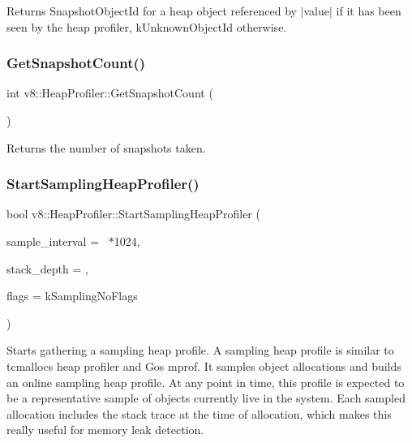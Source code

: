 Returns Snapshot\+Object\+Id for a heap object referenced by $\vert$value$\vert$ if it has been seen by the heap profiler, k\+Unknown\+Object\+Id otherwise. \mbox{\label{classv8_1_1HeapProfiler_a24830775a0ab938eb0a29ed8f3dfd265}} 
\subsubsection{\texorpdfstring{Get\+Snapshot\+Count()}{GetSnapshotCount()}}
{\footnotesize\ttfamily int v8\+::\+Heap\+Profiler\+::\+Get\+Snapshot\+Count (\begin{DoxyParamCaption}{ }\end{DoxyParamCaption})}

Returns the number of snapshots taken. \mbox{\label{classv8_1_1HeapProfiler_a6b9450bbf1f4e1a4909df92d4df4a174}} 
\subsubsection{\texorpdfstring{Start\+Sampling\+Heap\+Profiler()}{StartSamplingHeapProfiler()}}
{\footnotesize\ttfamily bool v8\+::\+Heap\+Profiler\+::\+Start\+Sampling\+Heap\+Profiler (\begin{DoxyParamCaption}\item[{uint64\+\_\+t}]{sample\+\_\+interval = {~$\ast$1024},  }\item[{int}]{stack\+\_\+depth = {},  }\item[{Sampling\+Flags}]{flags = {\ttfamily kSamplingNoFlags} }\end{DoxyParamCaption})}

Starts gathering a sampling heap profile. A sampling heap profile is similar to tcmalloc\textquotesingle{}s heap profiler and Go\textquotesingle{}s mprof. It samples object allocations and builds an online \textquotesingle{}sampling\textquotesingle{} heap profile. At any point in time, this profile is expected to be a representative sample of objects currently live in the system. Each sampled allocation includes the stack trace at the time of allocation, which makes this really useful for memory leak detection.

